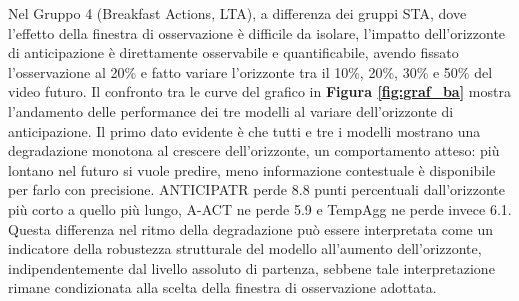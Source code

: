 Nel Gruppo 4 (Breakfast Actions, LTA), a differenza dei gruppi STA, dove l'effetto della finestra di osservazione è difficile da isolare, l'impatto dell'orizzonte di anticipazione è direttamente osservabile e quantificabile, avendo fissato l'osservazione al 20\% e fatto variare l'orizzonte tra il 10\%, 20\%, 30\% e 50\% del video futuro. Il confronto tra le curve del grafico in \textbf{Figura \ref{fig:graf_ba}}  mostra l'andamento delle performance dei tre modelli al variare dell'orizzonte di anticipazione. Il primo dato evidente è che tutti e tre i modelli mostrano una degradazione monotona al crescere dell'orizzonte, un comportamento atteso: più lontano nel futuro si vuole predire, meno informazione contestuale è disponibile per farlo con precisione. ANTICIPATR \cite{nawhal2022rethinking} perde 8.8 punti percentuali dall'orizzonte più corto a quello più lungo, A-ACT \cite{gupta2022act} ne perde 5.9 e TempAgg \cite{sener2021technical, sener2020temporal} ne perde invece 6.1. Questa differenza nel ritmo della degradazione può essere interpretata come un indicatore della robustezza strutturale del modello all'aumento dell'orizzonte, indipendentemente dal livello assoluto di partenza, sebbene tale interpretazione rimane condizionata alla scelta della finestra di osservazione adottata.
